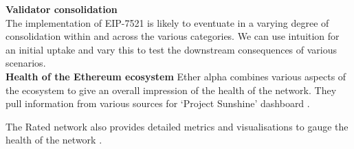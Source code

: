 \noindent
\textbf{Validator consolidation} \\
 The implementation of EIP-7521 is likely to eventuate in a varying degree of consolidation within and across the various categories. We can use intuition for an initial uptake and vary this to test the downstream consequences of various scenarios.  \\
 
 \noindent
\textbf{Health of the Ethereum ecosystem}
Ether alpha combines various aspects of the ecosystem to give an overall impression of the health of the network. They pull information from various sources for `Project Sunshine' dashboard \cite{easunshine}. 

The Rated network also provides detailed metrics and visualisations to gauge the health of the network \cite{Rated2023a}. 

 
 
 

